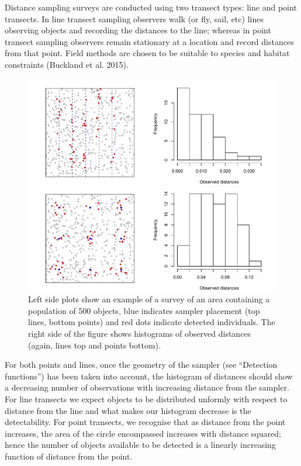 \documentclass[article]{jss}
\begin{document}
Distance sampling surveys are conducted using two transect types: line
and point transects. In line transect sampling observers walk (or fly,
sail, etc) lines observing objects and recording the distances to the
line; whereas in point transect sampling observers remain stationary at
a location and record distances from that point. Field methods are
chosen to be suitable to species and habitat constraints (Buckland et
al. 2015).

\begin{CodeChunk}
\begin{figure}

{\centering \includegraphics{paper_files/figure-latex/points-and-lines-1} 

}

\caption{Left side plots show an example of a survey of an area containing a population of 500 objects, blue indicates sampler placement (top lines, bottom points) and red dots indicate detected individuals. The right side of the figure shows histograms of observed distances (again, lines top and points bottom).\label{fig:pointslines}}\label{fig:points-and-lines}
\end{figure}
\end{CodeChunk}

For both points and lines, once the geometry of the sampler (see
``Detection functions'') has been taken into account, the histogram of
distances should show a decreasing number of observations with
increasing distance from the sampler. For line transects we expect
objects to be distributed unformly with respect to distance from the
line and what makes our histogram decrease is the detectability. For
point transects, we recognise that as distance from the point increases,
the area of the circle encompassed increases with distance squared;
hence the number of objects available to be detected is a linearly
increasing function of distance from the point.
\end{document}
